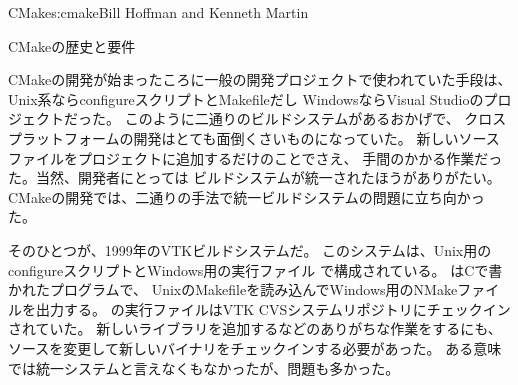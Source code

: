 \begin{aosachapter}{CMake}{s:cmake}{Bill Hoffman and Kenneth Martin}
\begin{aosasect1}{CMakeの歴史と要件}

CMakeの開発が始まったころに一般の開発プロジェクトで使われていた手段は、
Unix系ならconfigureスクリプトとMakefileだし
WindowsならVisual Studioのプロジェクトだった。
このように二通りのビルドシステムがあるおかげで、
クロスプラットフォームの開発はとても面倒くさいものになっていた。
新しいソースファイルをプロジェクトに追加するだけのことでさえ、
手間のかかる作業だった。当然、開発者にとっては
ビルドシステムが統一されたほうがありがたい。
CMakeの開発では、二通りの手法で統一ビルドシステムの問題に立ち向かった。

そのひとつが、1999年のVTKビルドシステムだ。
このシステムは、Unix用のconfigureスクリプトとWindows用の実行ファイル
で構成されている。
はCで書かれたプログラムで、
UnixのMakefileを読み込んでWindows用のNMakeファイルを出力する。
の実行ファイルはVTK CVSシステムリポジトリにチェックインされていた。
新しいライブラリを追加するなどのありがちな作業をするにも、
ソースを変更して新しいバイナリをチェックインする必要があった。
ある意味では統一システムと言えなくもなかったが、問題も多かった。


\end{aosasect1}
\end{aosachapter}
